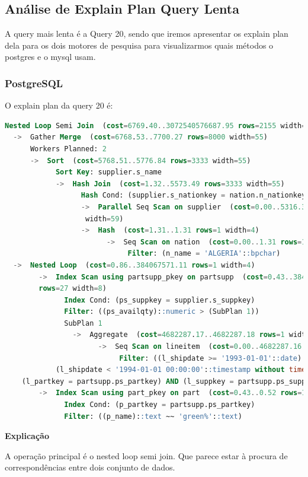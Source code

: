 \documentclass{article}
\begin{document}
\clearpage
\subsection{Análise de Explain Plan Query Lenta}


A query mais lenta é a Query 20, sendo que iremos apresentar os explain plan dela para os dois motores de pesquisa para visualizarmos quais métodos o postgres e o mysql usam.
\subsubsection{PostgreSQL}
O explain plan da query 20 é:\\
\begin{lstlisting}[language=SQL]
Nested Loop Semi Join  (cost=6769.40..3072540576687.95 rows=2155 width=51)
  ->  Gather Merge  (cost=6768.53..7700.27 rows=8000 width=55)
      Workers Planned: 2
      ->  Sort  (cost=5768.51..5776.84 rows=3333 width=55)
            Sort Key: supplier.s_name
            ->  Hash Join  (cost=1.32..5573.49 rows=3333 width=55)
                  Hash Cond: (supplier.s_nationkey = nation.n_nationkey)
                  ->  Parallel Seq Scan on supplier  (cost=0.00..5316.33 rows=83333
                   width=59)
                  ->  Hash  (cost=1.31..1.31 rows=1 width=4)
                        ->  Seq Scan on nation  (cost=0.00..1.31 rows=1 width=4)
                             Filter: (n_name = 'ALGERIA'::bpchar)
  ->  Nested Loop  (cost=0.86..384067571.11 rows=1 width=4)
        ->  Index Scan using partsupp_pkey on partsupp  (cost=0.43..384067557.06 
        rows=27 width=8)
              Index Cond: (ps_suppkey = supplier.s_suppkey)
              Filter: ((ps_availqty)::numeric > (SubPlan 1))
              SubPlan 1
                ->  Aggregate  (cost=4682287.17..4682287.18 rows=1 width=32)
                      ->  Seq Scan on lineitem  (cost=0.00..4682287.16 rows=1 width=5)
                           Filter: ((l_shipdate >= '1993-01-01'::date) AND 
            (l_shipdate < '1994-01-01 00:00:00'::timestamp without time zone) AND 
    (l_partkey = partsupp.ps_partkey) AND (l_suppkey = partsupp.ps_suppkey))
        ->  Index Scan using part_pkey on part  (cost=0.43..0.52 rows=1 width=4)
              Index Cond: (p_partkey = partsupp.ps_partkey)
              Filter: ((p_name)::text ~~ 'green%'::text)
  \end{lstlisting}

  \textbf{Explicação}

  A operação principal é o nested loop semi join. Que parece estar à procura de correspondências entre dois conjunto de dados.
\end{document}
